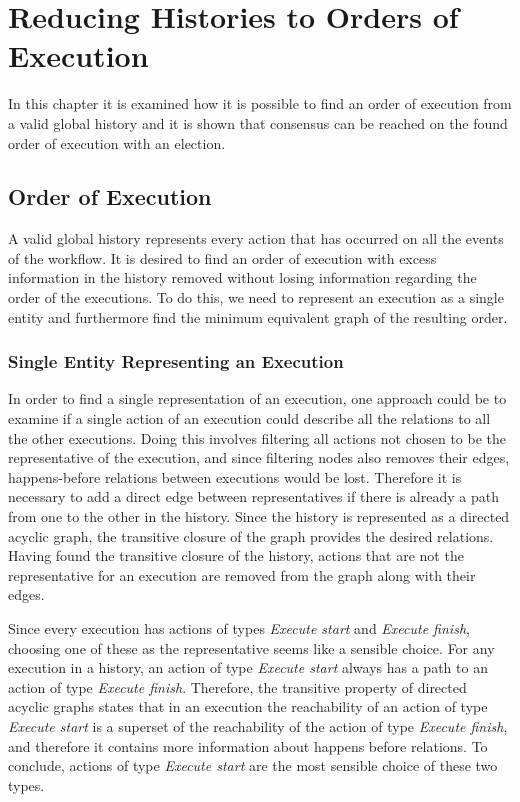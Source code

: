 \chapter{Reducing Histories to Orders of Execution}\label{chap:order-of-execution}
	In this chapter it is examined how it is possible to find an order of execution from a valid global history and it is shown that consensus can be reached on the found order of execution with an election.

\section{Order of Execution}
	A valid global history represents every action that has occurred on all the events of the workflow.
	It is desired to find an order of execution with excess information in the history removed without losing information regarding the order of the executions. To do this, we need to represent an execution as a single entity and furthermore find the minimum equivalent graph of the resulting order.
	
	\subsection{Single Entity Representing an Execution}
	In order to find a single representation of an execution, one approach could be to examine if a single action of an execution could describe all the relations to all the other executions. Doing this involves filtering all actions not chosen to be the representative of the execution, and since filtering nodes also removes their edges, happens-before relations between executions would be lost. Therefore it is necessary to add a direct edge between representatives if there is already a path from one to the other in the history. Since the history is represented as a directed acyclic graph, the transitive closure of the graph provides the desired relations. Having found the transitive closure of the history, actions that are not the representative for an execution are removed from the graph along with their edges.
	
	Since every execution has actions of types \textit{Execute start} and \textit{Execute finish}, choosing one of these as the representative seems like a sensible choice. For any execution in a history, an action of type \textit{Execute start} always has a path to an action of type \textit{Execute finish}. Therefore, the transitive property of directed acyclic graphs states that in an execution the reachability of an action of type \textit{Execute start} is a superset of the reachability of the action of type \textit{Execute finish}, and therefore it contains more information about happens before relations. To conclude, actions of type \textit{Execute start} are the most sensible choice of these two types.
	
